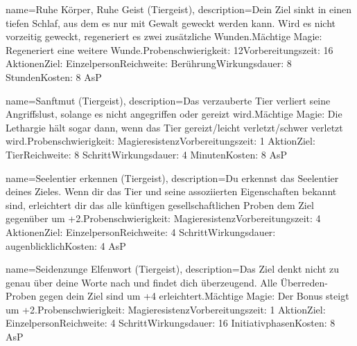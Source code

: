 {
    name={Ruhe Körper, Ruhe Geist (Tiergeist)},
    description={Dein Ziel sinkt in einen tiefen Schlaf, aus dem es nur mit Gewalt geweckt werden kann. Wird es nicht vorzeitig geweckt, regeneriert es zwei zusätzliche Wunden.\newline Mächtige Magie: Regeneriert eine weitere Wunde.\newline Probenschwierigkeit: 12\newline Vorbereitungszeit: 16 Aktionen\newline Ziel: Einzelperson\newline Reichweite: Berührung\newline Wirkungsdauer: 8 Stunden\newline Kosten: 8 AsP}
}


{
    name={Sanftmut (Tiergeist)},
    description={Das verzauberte Tier verliert seine Angriffslust, solange es nicht angegriffen oder gereizt wird.\newline Mächtige Magie: Die Lethargie hält sogar dann, wenn das Tier gereizt/leicht verletzt/schwer verletzt wird.\newline Probenschwierigkeit: Magieresistenz\newline Vorbereitungszeit: 1 Aktion\newline Ziel: Tier\newline Reichweite: 8 Schritt\newline Wirkungsdauer: 4 Minuten\newline Kosten: 8 AsP}
}


{
    name={Seelentier erkennen (Tiergeist)},
    description={Du erkennst das Seelentier deines Zieles. Wenn dir das Tier und seine assoziierten Eigenschaften bekannt sind, erleichtert dir das alle künftigen gesellschaftlichen Proben dem Ziel gegenüber um +2.\newline Probenschwierigkeit: Magieresistenz\newline Vorbereitungszeit: 4 Aktionen\newline Ziel: Einzelperson\newline Reichweite: 4 Schritt\newline Wirkungsdauer: augenblicklich\newline Kosten: 4 AsP}
}


{
    name={Seidenzunge Elfenwort (Tiergeist)},
    description={Das Ziel denkt nicht zu genau über deine Worte nach und findet dich überzeugend. Alle Überreden-Proben gegen dein Ziel sind um +4 erleichtert.\newline Mächtige Magie: Der Bonus steigt um +2.\newline Probenschwierigkeit: Magieresistenz\newline Vorbereitungszeit: 1 Aktion\newline Ziel: Einzelperson\newline Reichweite: 4 Schritt\newline Wirkungsdauer: 16 Initiativphasen\newline Kosten: 8 AsP}
}



